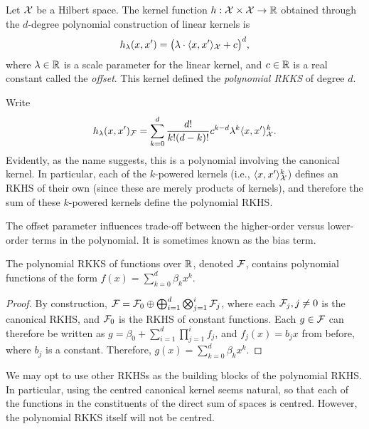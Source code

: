 \documentclass[a4paper,showframe,11pt,draft]{report}
\begin{document}
\begin{definition}
  Let ${\mathcal X}$ be a Hilbert space.
  The kernel function $h:{\mathcal X}\times{\mathcal X}\to\mathbb{R}$ obtained through the $d$-degree polynomial construction of linear kernels is
  \[
    h_\lambda(x,x') = \big(\lambda\cdot\langle x,x'\rangle_{\mathcal X} + c\big)^d,
  \]
  where $\lambda \in \mathbb{R}$ is a scale parameter for the linear kernel, and $c \in \mathbb{R}$ is a real constant called the \emph{offset}.
  This kernel defined the \emph{polynomial RKKS} of degree $d$.
\end{definition}

Write
\begin{align*}
  h_\lambda(x,x')_{\mathcal F} = \sum_{k=0}^d \frac{d!}{k!(d-k)!} c^{k-d} \lambda^k \langle x,x'\rangle_{\mathcal X}^k.
\end{align*}
Evidently, as the name suggests, this is a polynomial involving the canonical kernel.
In particular, each of the $k$-powered kernels (i.e., $\langle x,x'\rangle_{\mathcal X}^k$) defines an RKHS of their own (since these are merely products of kernels), and therefore the sum of these $k$-powered kernels define the polynomial RKHS.

The offset parameter influences trade-off between the higher-order versus lower-order terms in the polynomial.
It is sometimes known as the bias term.

\begin{claim}
  The polynomial RKKS of functions over $\mathbb{R}$, denoted ${\mathcal F}$, contains polynomial functions of the form $f(x)=\sum_{k=0}^d \beta_k x^k$.
\end{claim}

\begin{proof}
  By construction, ${\mathcal F} = {\mathcal F}_0 \oplus \bigoplus_{i=1}^d\bigotimes_{j=1}^i {\mathcal F}_j$, where each ${\mathcal F}_j, j \neq 0$ is the canonical RKHS, and ${\mathcal F}_0$ is the RKHS of constant functions.
  Each $g \in {\mathcal F}$ can therefore be written as $g = \beta_0 + \sum_{i=1}^d\prod_{j=1}^i f_j$, and $f_j(x)= b_j x$ from before, where $b_j$ is a constant.
  Therefore, $g(x) = \sum_{k=0}^d \beta_k x^k$.
\end{proof}

\begin{remark}
  We may opt to use other RKHSs as the building blocks of the polynomial RKHS.
  In particular, using the centred canonical kernel seems natural, so that each of the functions in the constituents of the direct sum of spaces is centred.
  However, the polynomial RKKS itself will not be centred.
\end{remark}
\end{document}
